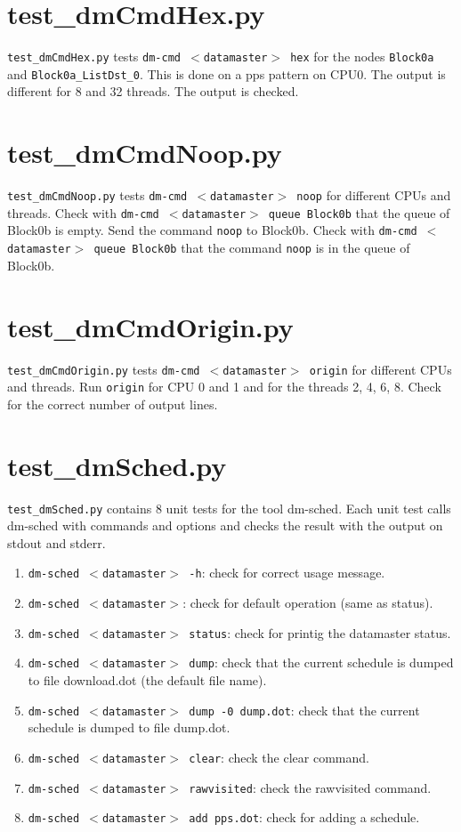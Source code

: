 \documentclass[12pt,a4paper]{report}
\begin{document}
\section{test\_dmCmdHex.py}
\texttt{test\_dmCmdHex.py} tests \texttt{dm-cmd $<$datamaster$>$ hex}
for the nodes \texttt{Block0a} and \texttt{Block0a\_ListDst\_0}. This
is done on a pps pattern on CPU0. The output is different for 8 and 32 threads.
The output is checked.

\section{test\_dmCmdNoop.py}
\texttt{test\_dmCmdNoop.py} tests \texttt{dm-cmd $<$datamaster$>$ noop} for different CPUs and threads.
Check with \texttt{dm-cmd $<$datamaster$>$ queue Block0b} that the queue of Block0b is empty.
Send the command \texttt{noop} to Block0b. Check with \texttt{dm-cmd $<$datamaster$>$ queue Block0b}
that the command \texttt{noop} is in the queue of Block0b.

\section{test\_dmCmdOrigin.py}
\texttt{test\_dmCmdOrigin.py} tests \texttt{dm-cmd $<$datamaster$>$ origin} for different CPUs and threads.
Run \texttt{origin} for CPU 0 and 1 and for the threads 2, 4, 6, 8.
Check for the correct number of output lines.

\section{test\_dmSched.py}
\texttt{test\_dmSched.py} contains 8 unit tests for the tool dm-sched. Each unit test calls dm-sched
with commands and options and checks the result with the output on stdout and stderr.

\begin{enumerate}
\item \texttt{dm-sched $<$datamaster$>$ -h}: check for correct usage message.
\item \texttt{dm-sched $<$datamaster$>$}: check for default operation (same as status).
\item \texttt{dm-sched $<$datamaster$>$ status}: check for printig the datamaster status.
\item \texttt{dm-sched $<$datamaster$>$ dump}: check that the current schedule is dumped to file download.dot (the default file name).
\item \texttt{dm-sched $<$datamaster$>$ dump -0 dump.dot}: check that the current schedule is dumped to file dump.dot.
\item \texttt{dm-sched $<$datamaster$>$ clear}: check the clear command.
\item \texttt{dm-sched $<$datamaster$>$ rawvisited}: check the rawvisited command.
\item \texttt{dm-sched $<$datamaster$>$ add pps.dot}: check for adding a schedule.
\end{enumerate}
\end{document}
